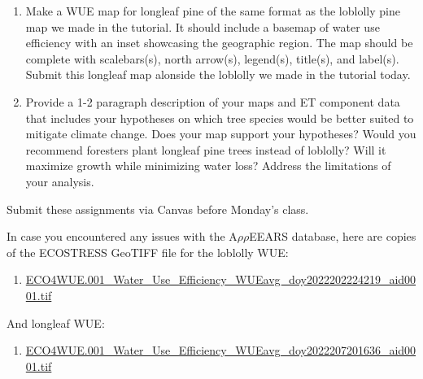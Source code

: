 \documentclass[oneside,a4paper,11pt,explicit]{book}
\begin{document}
\begin{tcolorbox}[colback=yellow!5!white,colframe=IceCreamOrbit,title= \vspace{.2em} \Large Map of the Week Assignments]
	\large
	\begin{enumerate}
		\item Make a WUE map for longleaf pine of the same format as the loblolly pine map we made in the tutorial. It should include a basemap of water use efficiency with an inset showcasing the geographic region. The map should be complete with scalebars(s), north arrow(s), legend(s), title(s), and label(s). Submit this longleaf map alonside the loblolly we made in the tutorial today.
        \item Provide a 1-2 paragraph description of your maps and ET component data that includes your hypotheses on which tree species would be better suited to mitigate climate change. Does your map support your hypotheses? Would you recommend foresters plant longleaf pine trees instead of loblolly? Will it maximize growth while minimizing water loss? Address the limitations of your analysis.
	\end{enumerate}
	Submit these assignments via Canvas before Monday's class.
\end{tcolorbox}

\begin{tcolorbox}[colback=yellow!5!white,title=\textbf{Datafiles}]
	\large
	In case you encountered any issues with the A$\rho\rho$EEARS database, here are copies of the ECOSTRESS GeoTIFF file for the loblolly WUE:
	\begin{enumerate}
		\item \href{https://jeremydforsythe.github.io/icecream-tutorials/Tutorial7_Evaportranspiration2/ECO4WUE.001_Water_Use_Efficiency_WUEavg_doy2022202224219_aid0001.tif}{\small ECO4WUE.001\_Water\_Use\_Efficiency\_WUEavg\_doy2022202224219\_aid0001.tif}
	\end{enumerate}
	And longleaf WUE:
	\begin{enumerate}
		\item \href{https://jeremydforsythe.github.io/icecream-tutorials/Tutorial7_Evaportranspiration2/ECO4WUE.001_Water_Use_Efficiency_WUEavg_doy2022207201636_aid0001.tif}{\small ECO4WUE.001\_Water\_Use\_Efficiency\_WUEavg\_doy2022207201636\_aid0001.tif}
	\end{enumerate}
\end{tcolorbox}
\end{document}
